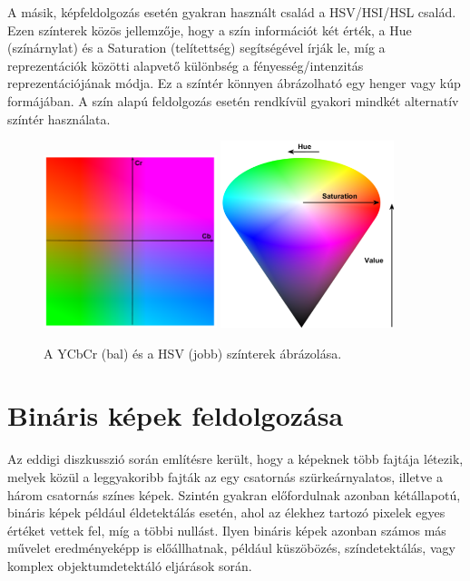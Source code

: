 \documentclass[12pt,a4paper,oneside]{report}             %
\begin{document}
A másik, képfeldolgozás esetén gyakran használt család a HSV/HSI/HSL család. Ezen színterek közös jellemzője, hogy a szín információt két érték, a Hue (színárnylat) és a Saturation (telítettség) segítségével írják le, míg a reprezentációk közötti alapvető különbség a fényesség/intenzitás reprezentációjának módja. Ez a színtér könnyen ábrázolható egy henger vagy kúp formájában. A szín alapú feldolgozás esetén rendkívül gyakori mindkét alternatív színtér használata.

\begin{figure}
	\centering
	\includegraphics[width=0.45\textwidth]{images/YCBCR.png}
	\includegraphics[width=0.45\textwidth]{images/HSV.png}
	\label{fig:2}
	\caption{A YCbCr (bal) és a HSV (jobb) színterek ábrázolása.}
\end{figure}

\section{Bináris képek feldolgozása}

Az eddigi diszkusszió során említésre került, hogy a képeknek több fajtája létezik, melyek közül a leggyakoribb fajták az egy csatornás szürkeárnyalatos, illetve a három csatornás színes képek. Szintén gyakran előfordulnak azonban kétállapotú, bináris képek például éldetektálás esetén, ahol az élekhez tartozó pixelek egyes értéket vettek fel, míg a többi nullást. Ilyen bináris képek azonban számos más művelet eredményeképp is előállhatnak, például küszöbözés, színdetektálás, vagy komplex objektumdetektáló eljárások során.
\end{document}
